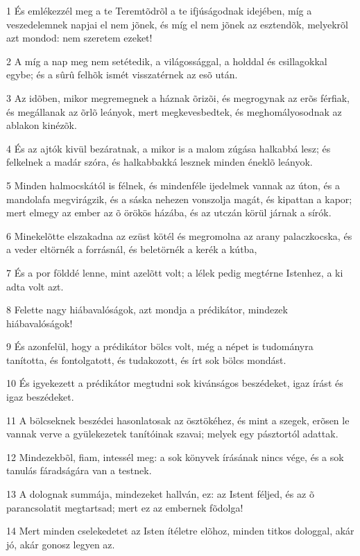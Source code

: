 \par 1 És emlékezzél meg a te Teremtõdrõl a te ifjúságodnak idejében, míg a veszedelemnek napjai el nem jõnek, és míg el nem jõnek az esztendõk, melyekrõl azt mondod: nem szeretem ezeket!
\par 2 A míg a nap meg nem setétedik, a világossággal, a holddal és csillagokkal egybe; és a sûrû felhõk ismét visszatérnek az esõ után.
\par 3 Az idõben, mikor megremegnek a háznak õrizõi, és megrogynak az erõs férfiak, és megállanak az õrlõ leányok, mert megkevesbedtek, és meghomályosodnak az ablakon kinézõk.
\par 4 És az ajtók kivül bezáratnak, a mikor is a malom zúgása halkabbá lesz; és felkelnek a madár szóra, és halkabbakká lesznek minden éneklõ leányok.
\par 5 Minden halmocskától is félnek, és mindenféle ijedelmek vannak az úton, és a mandolafa megvirágzik, és a sáska nehezen vonszolja magát, és kipattan a kapor; mert elmegy az ember az õ örökös házába, és az utczán körül járnak a sírók.
\par 6 Minekelõtte elszakadna az ezüst kötél és megromolna az arany palaczkocska, és a veder eltörnék a forrásnál, és beletörnék a kerék a kútba,
\par 7 És a por földdé lenne, mint azelõtt volt; a lélek pedig megtérne Istenhez, a ki  adta volt azt.
\par 8 Felette nagy hiábavalóságok, azt mondja a prédikátor, mindezek hiábavalóságok!
\par 9 És azonfelül, hogy a prédikátor bölcs volt, még a népet is tudományra tanította, és fontolgatott, és tudakozott, és írt sok bölcs mondást.
\par 10 És igyekezett a prédikátor megtudni sok kivánságos beszédeket, igaz írást és igaz beszédeket.
\par 11 A bölcseknek beszédei hasonlatosak az ösztökéhez, és mint a szegek, erõsen le vannak verve a gyülekezetek tanítóinak szavai; melyek egy pásztortól adattak.
\par 12 Mindezekbõl, fiam, intessél meg: a sok könyvek írásának nincs vége, és a sok tanulás fáradságára van a testnek.
\par 13 A dolognak summája, mindezeket hallván, ez: az Istent féljed, és az õ parancsolatit megtartsad; mert ez az embernek fõdolga!
\par 14 Mert minden cselekedetet az Isten ítéletre elõhoz, minden titkos dologgal, akár jó, akár gonosz legyen az.


